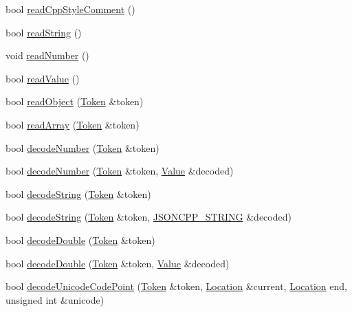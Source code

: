 \begin{DoxyCompactItemize}
bool \hyperlink{class_json_1_1_reader_a6716ef6290b0f469efaf8d379c357967}{read\+Cpp\+Style\+Comment} ()
\item 
bool \hyperlink{class_json_1_1_reader_a6328a0b1994e05118886f9fc9c608643}{read\+String} ()
\item 
void \hyperlink{class_json_1_1_reader_afb31bfda6bb27d6453057a47655e8363}{read\+Number} ()
\item 
bool \hyperlink{class_json_1_1_reader_a47e56844b803d41ec993a83fadf4495c}{read\+Value} ()
\item 
bool \hyperlink{class_json_1_1_reader_a0068eb3d8e86e91f0e4806f60da66b9c}{read\+Object} (\hyperlink{class_json_1_1_reader_1_1_token}{Token} \&token)
\item 
bool \hyperlink{class_json_1_1_reader_afd9a30c0af205c9f327613f486fae6b8}{read\+Array} (\hyperlink{class_json_1_1_reader_1_1_token}{Token} \&token)
\item 
bool \hyperlink{class_json_1_1_reader_a442d1f23edf0f4350f5eeab3ee3f7d46}{decode\+Number} (\hyperlink{class_json_1_1_reader_1_1_token}{Token} \&token)
\item 
bool \hyperlink{class_json_1_1_reader_a72f426ce3fa384d14aa10e9dd75618f0}{decode\+Number} (\hyperlink{class_json_1_1_reader_1_1_token}{Token} \&token, \hyperlink{class_json_1_1_value}{Value} \&decoded)
\item 
bool \hyperlink{class_json_1_1_reader_aaf736937912f5c9b8d221e57f209e3e0}{decode\+String} (\hyperlink{class_json_1_1_reader_1_1_token}{Token} \&token)
\item 
bool \hyperlink{class_json_1_1_reader_a8911a3225ee94d86d83edc2f8c1befe0}{decode\+String} (\hyperlink{class_json_1_1_reader_1_1_token}{Token} \&token, \hyperlink{config_8h_a1e723f95759de062585bc4a8fd3fa4be}{J\+S\+O\+N\+C\+P\+P\+\_\+\+S\+T\+R\+I\+NG} \&decoded)
\item 
bool \hyperlink{class_json_1_1_reader_a2420bbb7fd6d5d3e7e2fea894dd8f70f}{decode\+Double} (\hyperlink{class_json_1_1_reader_1_1_token}{Token} \&token)
\item 
bool \hyperlink{class_json_1_1_reader_a5e4a66be7c413bca86078f14df5eb802}{decode\+Double} (\hyperlink{class_json_1_1_reader_1_1_token}{Token} \&token, \hyperlink{class_json_1_1_value}{Value} \&decoded)
\item 
bool \hyperlink{class_json_1_1_reader_a8fe24db3e9953aef3d637a56447e795c}{decode\+Unicode\+Code\+Point} (\hyperlink{class_json_1_1_reader_1_1_token}{Token} \&token, \hyperlink{class_json_1_1_reader_a46795b5b272bf79a7730e406cb96375a}{Location} \&current, \hyperlink{class_json_1_1_reader_a46795b5b272bf79a7730e406cb96375a}{Location} end, unsigned int \&unicode)

\end{DoxyCompactItemize}
